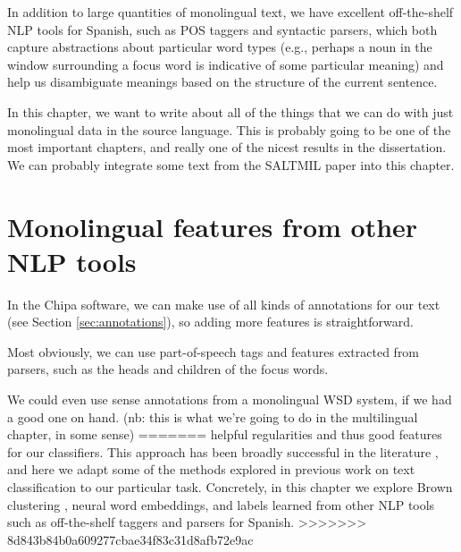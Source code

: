 
In addition to large quantities of monolingual text, we have excellent
off-the-shelf NLP tools for Spanish, such as POS taggers and syntactic parsers,
which both capture abstractions about particular word types (e.g., perhaps a
noun in the window surrounding a focus word is indicative of some particular
meaning) and help us disambiguate meanings based on the structure of the
current sentence.

In this chapter, we want to write about all of the things that we can do with
just monolingual data in the source language.
This is probably going to be one of the most important chapters, and really one
of the nicest results in the dissertation.
We can probably integrate some text from the SALTMIL paper into this chapter.


\section{Monolingual features from other NLP tools}
In the Chipa software, we can make use of all kinds of annotations for our
text (see Section \ref{sec:annotations}), so adding more features is
straightforward.

Most obviously, we can use part-of-speech tags and features extracted from
parsers, such as the heads and children of the focus words.

We could even use sense annotations from a monolingual WSD system, if we had a
good one on hand. (nb: this is what we're going to do in the multilingual
chapter, in some sense)
=======
helpful regularities and thus good features for our classifiers. This approach
has been broadly successful in the literature
\cite{turian-ratinov-bengio:2010:ACL}
, and here we adapt some of the methods explored in previous work on text
classification to our particular task. Concretely, in this chapter we explore
Brown clustering \cite{brown1992class}, neural word embeddings, and labels
learned from other NLP tools such as off-the-shelf taggers and parsers for
Spanish.
>>>>>>> 8d843b84b0a609277cbae34f83c31d8afb72e9ac


